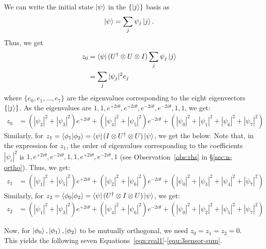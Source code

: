 \begin{prf}
We can write the initial state $\ket{\psi}$ in the  $\{ \ket{j} \}$ basis as
$$\ket{\psi} = \sum\limits_j \psi_j \ket{j}.$$ 
Thus, we get 
\begin{align*}
    z_0 &=  \bra{\psi}(U^{\dagger} \otimes U \otimes I) \sum\limits_j \psi_j \ket{j}   \\
        &=  \sum\limits_j |\psi_j|^{2} e_j
\end{align*} 
\noindent
where $\{e_0, e_1, \ldots, e_7\}$ are the  eigenvalues corresponding to the eight eigenvectors $\{\ket{j}\}$.
As the eigenvalues are $1, 1, e^{+2i\theta}, e^{+2i\theta}, e^{-2i\theta}, e^{-2i\theta}, 1, 1$, we get:
\begin{align}
        z_0 &= (|\psi_2|^{2} + |\psi_3|^{2})e^{+2i\theta} + (|\psi_4|^{2} + |\psi_5|^{2})e^{-2i\theta} + (|\psi_0|^{2} + |\psi_1|^{2} + |\psi_6|^{2}+ |\psi_7|^{2}) 
\end{align}
Similarly, for $z_1 = \bra{\phi_1}\ket{\phi_2} = \bra{\psi}(I  \otimes U^{\dagger} \otimes U) \ket{\psi}$, we get the below. 
Note that, in the expression for $z_1$, 
the order of eigenvalues corresponding to the coefficients 
$|\psi_i|^{2}$ is $1, e^{+2i\theta}, e^{-2i\theta}, 1, 1, e^{+2i\theta}, e^{-2i\theta}, 1$ 
(see Observation~\ref{obs:rhs} in \S\ref{sec:n-ortho}). Thus, we get: 
\begin{align}
    z_1 &= (|\psi_1|^{2} + |\psi_5|^{2})e^{+2i\theta} + (|\psi_2|^{2} + |\psi_6|^{2})e^{-2i\theta} + (|\psi_0|^{2} + |\psi_3|^{2} + |\psi_4|^{2}+ |\psi_7|^{2})
\end{align}
Similarly, for $z_2 =  \bra{\phi_0}\ket{\phi_2} = \bra{\psi}( U^{\dagger}  \otimes I \otimes U) \ket{\psi}$, 
we get:
\begin{align}
    z_2 &= (|\psi_1|^{2} + |\psi_3|^{2})e^{+2i\theta} + (|\psi_4|^{2} + |\psi_6|^{2})e^{-2i\theta} + (|\psi_0|^{2} + |\psi_2|^{2} + |\psi_5|^{2}+ |\psi_7|^{2})
\end{align}


Now, for $\ket{\phi_0}, \ket{\phi_1}, \ket{\phi_2}$ to be mutually orthogonal, we need $z_0 = z_1 = z_2 = 0$. This yields the following seven Equations~\ref{eqn:real1}-\ref{equ:3sensor-sum}.


\end{prf}

